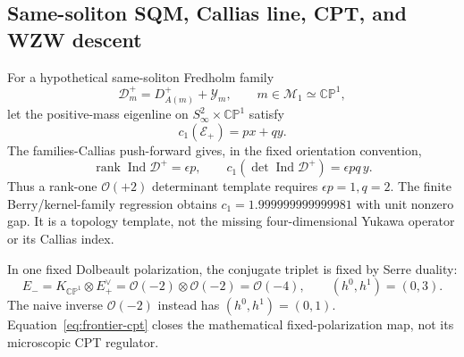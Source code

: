 \documentclass[11pt]{article}
\numberwithin{equation}{section}
\newcommand{\Ind}{\operatorname{Ind}}
\begin{document}
\subsection{Same-soliton SQM, Callias line, CPT, and WZW descent}

For a hypothetical same-soliton Fredholm family
\begin{equation}
 \mathscr D_m^+=D_{A(m)}^++\mathscr Y_m,
 \qquad m\in\mathcal M_1\simeq\mathbb{CP}^1,
 \label{eq:frontier-callias-family}
\end{equation}
let the positive-mass eigenline on
\(S^2_\infty\times\mathbb{CP}^1\) satisfy
\begin{equation}
 c_1(\mathcal E_+)=p x+q y.
 \label{eq:frontier-positive-line}
\end{equation}
The families-Callias push-forward gives, in the fixed orientation
convention,
\begin{equation}
 \operatorname{rank}\Ind\mathscr D^+=\epsilon p,\qquad
 c_1(\det\Ind\mathscr D^+)=\epsilon p q\,y.
 \label{eq:frontier-callias-pushforward}
\end{equation}
Thus a rank-one \(\mathcal O(+2)\) determinant template requires
\(\epsilon p=1,q=2\).  The finite Berry/kernel-family regression obtains
\(c_1=1.999999999999981\) with unit nonzero gap.  It is a topology
template, not the missing four-dimensional Yukawa operator or its Callias
index.

In one fixed Dolbeault polarization, the conjugate triplet is fixed by
Serre duality:
\begin{equation}
 E_-=
 K_{\mathbb{CP}^1}\otimes E_+^\vee
 =\mathcal O(-2)\otimes\mathcal O(-2)
 =\mathcal O(-4),
 \qquad (h^0,h^1)=(0,3).
 \label{eq:frontier-cpt}
\end{equation}
The naive inverse \(\mathcal O(-2)\) instead has \((h^0,h^1)=(0,1)\).
Equation~\eqref{eq:frontier-cpt} closes the mathematical fixed-polarization
map, not its microscopic CPT regulator.
\end{document}
